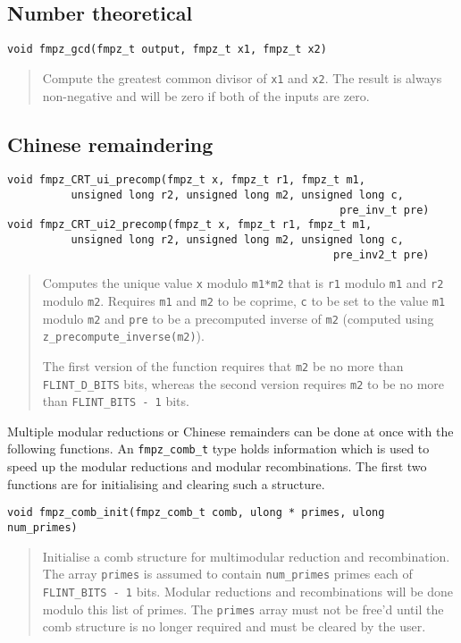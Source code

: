 \documentclass[a4paper,10pt]{article}
\newcommand{\code}{\lstinline}
\begin{document}
\subsection{Number theoretical}

\begin{lstlisting}
void fmpz_gcd(fmpz_t output, fmpz_t x1, fmpz_t x2)
\end{lstlisting}
\begin{quote}
Compute the greatest common divisor of \code{x1} and \code{x2}. The result is always non-negative and will be zero if both of the inputs are zero.
\end{quote}

\subsection{Chinese remaindering}
\begin{lstlisting}
void fmpz_CRT_ui_precomp(fmpz_t x, fmpz_t r1, fmpz_t m1, 
          unsigned long r2, unsigned long m2, unsigned long c, 
                                                    pre_inv_t pre)
void fmpz_CRT_ui2_precomp(fmpz_t x, fmpz_t r1, fmpz_t m1, 
          unsigned long r2, unsigned long m2, unsigned long c, 
                                                   pre_inv2_t pre)
\end{lstlisting}
\begin{quote}
Computes the unique value \code{x} modulo \code{m1*m2} that is \code{r1} modulo \code{m1} and \code{r2} modulo \code{m2}. Requires \code{m1} and \code{m2} to be coprime, \code{c} to be set to the value \code{m1} modulo \code{m2} and \code{pre} to be a precomputed inverse of \code{m2} (computed using \code{z_precompute_inverse(m2)}). 

The first version of the function requires that \code{m2} be no more than \code{FLINT_D_BITS} bits, whereas the second version requires \code{m2} to be no more than \code{FLINT_BITS - 1} bits.
\end{quote}

Multiple modular reductions or Chinese remainders can be done at once with the following functions. An \code{fmpz_comb_t} type holds information which is used to speed up the modular reductions and modular recombinations. The first two functions are for initialising and clearing such a structure.

\begin{lstlisting}
void fmpz_comb_init(fmpz_comb_t comb, ulong * primes, ulong num_primes)
\end{lstlisting}
\begin{quote}
Initialise a comb structure for multimodular reduction and recombination. The array \code{primes} is assumed to contain \code{num_primes} primes each of \code{FLINT_BITS - 1} bits. Modular reductions and recombinations will be done modulo this list of primes. The \code{primes} array must not be free'd until the comb structure is no longer required and must be cleared by the user.
\end{quote}
\end{document}
